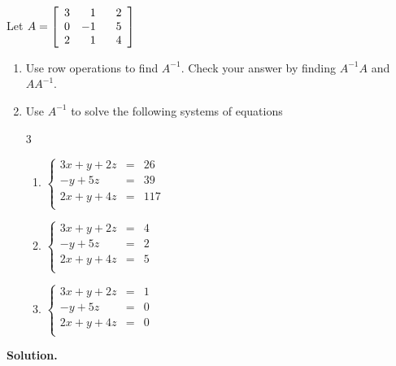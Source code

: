 \documentclass{ximera}
\begin{document}
\begin{example} \label{matrixinverseex} Let $A = \left[ \begin{array}{rrr} 3 & 1 & \hphantom{-}2 \\ 0 & -1 & 5 \\ 2 & 1 & 4 \\ \end{array} \right]$

\begin{enumerate}

\item  Use row operations to find $A^{-1}$.  Check your answer by finding $A^{-1}A$ and $AA^{-1}$.

\item  Use $A^{-1}$ to solve the following systems of equations

\begin{multicols}{3}

\begin{enumerate}

\item $\left\{ \begin{array}{rcl}   3x+y+2z & = & 26 \\-y+5z & = & 39 \\ 2x+y+4z&=& 117 \\ \end{array} \right.$

\item $\left\{ \begin{array}{rcl} 3x+y+2z & = & 4 \\-y+5z & = & 2 \\ 2x+y+4z&=& 5 \\ \end{array} \right.$

\item $\left\{ \begin{array}{rcl} 3x+y+2z & = & 1 \\-y+5z & = & 0 \\ 2x+y+4z&=& 0 \\ \end{array} \right.$

\end{enumerate}

\end{multicols}

\end{enumerate}

{\bf Solution.}  

\begin{enumerate}


\end{enumerate}
\end{example}
\end{document}
